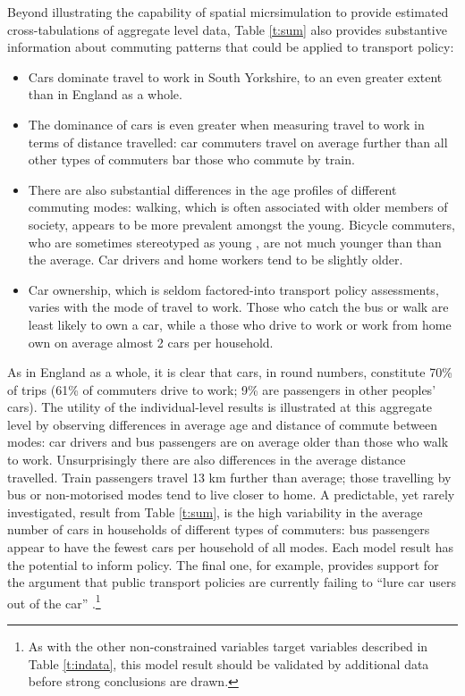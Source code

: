 Beyond illustrating the capability of spatial micrsimulation to provide
estimated cross-tabulations of aggregate level data,
Table \ref{t:sum} also provides substantive information
about commuting patterns that could be applied to transport policy:
\begin{itemize}
 \item Cars dominate travel to work in South Yorkshire, to an
even greater extent than in England as a whole.
\item The dominance of cars is even greater when measuring travel
to work in terms of distance travelled: car commuters travel on
average further than all other types of commuters bar those who commute
by train.
\item There are also substantial differences in the age profiles of
different commuting modes: walking, which is often associated with older
members of society, appears to be more prevalent amongst the young. Bicycle commuters,
who are sometimes stereotyped as young \citep{Daley2011}, are not much younger than
than the average. Car drivers and home workers tend to be slightly older.
\item Car ownership, which is seldom factored-into transport policy assessments,
\citep{Kay2011}
varies with the mode of travel to work. Those who catch the bus or walk are least
likely to own a car, while a those who drive to work or work from home own on
average almost 2 cars per household.
\end{itemize}


As in England as a whole, it is clear that cars, in round numbers, constitute
70\% of trips (61\% of commuters drive to work; 9\%
are passengers in other peoples' cars). The utility of the individual-level
results is illustrated at this aggregate level by observing differences in
average age and distance of commute between modes: car drivers and bus
passengers are on average older than those who walk to work.
Unsurprisingly there are also differences in the average distance
travelled. Train passengers travel 13 km further than average;
those travelling by bus or non-motorised modes tend to live closer
to home.
A predictable, yet rarely investigated, result from Table \ref{t:sum},
is the high variability in the average number of cars in households of different
types of commuters: bus passengers appear to have the fewest cars per household
of all modes. Each model result has the potential to inform policy. The final one,
for example, provides support for the argument
 that public transport policies are currently failing to
 ``lure car users out of the car''
\citep[p.~193]{Davison2006}.\footnote{As
with the
other non-constrained variables target variables described in Table
\ref{t:indata}, this model result should be validated by additional data before
strong conclusions are drawn.}

